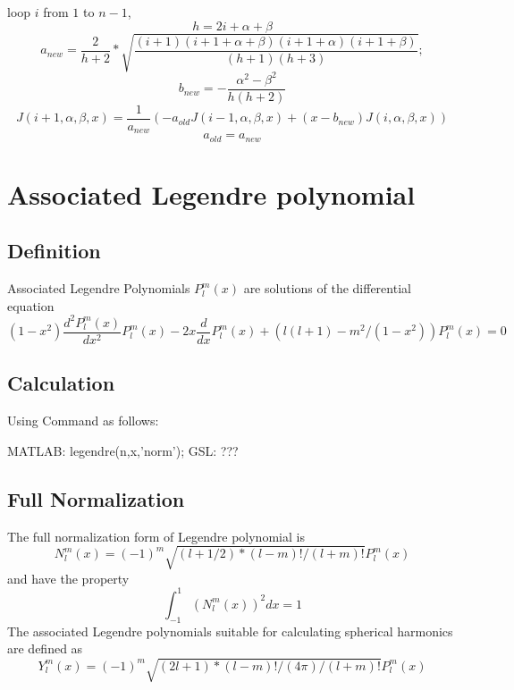 \documentclass{article}
\begin{document}
loop $i$ from $1$ to $n-1$,
\begin{equation}
h = 2i+\alpha+\beta
\end{equation}
\begin{equation}
a_{new} = \frac{2}{h+2}*\sqrt{ \frac{(i+1)(i+1+\alpha+\beta)(i+1+\alpha)
      (i+1+\beta)}{(h+1)(h+3)}};
\end{equation}
\begin{equation}
b_{new} = -\frac{\alpha^2-\beta^2}{h(h+2)}
\end{equation}
\begin{equation}
J(i+1,\alpha,\beta,x) = \frac{1}{a_{new}}(-a_{old}J(i-1,\alpha,\beta,x) + (x-b_{new})J(i,\alpha,\beta,x))
\end{equation}
\begin{equation}
a_{old} = a_{new}
\end{equation}
\section{Associated Legendre polynomial}
\subsection{Definition}
Associated Legendre Polynomials $P_l^m(x)$ are solutions of the differential equation
\begin{equation}
(1 - x^2) \frac{d^2 P_l^m(x)}{ dx^2 }P_l^m(x) - 2x \frac{d}{dx
} P_l^m(x) +
( l(l+1) - m^2 / (1 - x^2) ) P_l^m(x) = 0
\end{equation}
\subsection{Calculation}
Using Command as follows:

MATLAB: legendre(n,x,'norm');
GSL: ???


\subsection{Full Normalization}
The full normalization form of Legendre polynomial is
\begin{equation}
N_l^m(x) = (-1)^m \sqrt{(l + 1/2) * (l-m)! / (l+m)!} P_l^m(x)
\end{equation}
and have the property
\begin{equation}
\int_{-1}^1 ( N_l^m(x) )^2 dx = 1
\end{equation}
The associated Legendre polynomials suitable for calculating spherical harmonics are defined as 
\begin{equation}
Y_l^m(x) = (-1)^m \sqrt{(2l + 1) * (l-m)! / (4 \pi) / (l+m)!} P_l^m(x)
\end{equation}
\end{document}
